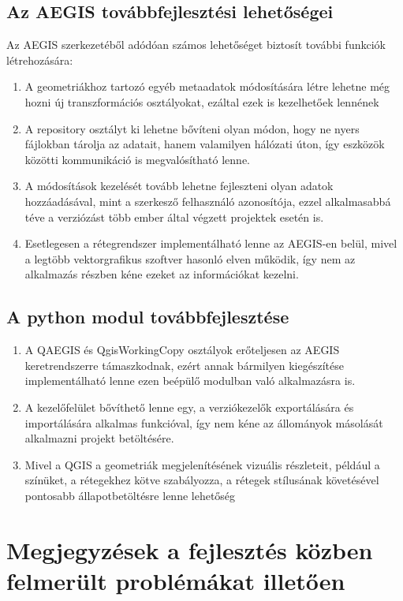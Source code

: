\subsection{Az AEGIS továbbfejlesztési lehetőségei}
Az AEGIS szerkezetéből adódóan számos lehetőséget biztosít további funkciók létrehozására:
\begin{enumerate}
	\item A geometriákhoz tartozó egyéb metaadatok módosítására létre lehetne még hozni új transzformációs osztályokat, ezáltal ezek is kezelhetőek lennének
	\item A repository osztályt ki lehetne bővíteni olyan módon, hogy ne nyers fájlokban tárolja az adatait, hanem valamilyen hálózati úton, így eszközök közötti kommunikáció is megvalósítható lenne.
	\item A módosítások kezelését tovább lehetne fejleszteni olyan adatok hozzáadásával, mint a szerkesző felhasználó azonosítója, ezzel alkalmasabbá téve a verziózást több ember által végzett projektek esetén is.
	\item Esetlegesen a rétegrendszer implementálható lenne az AEGIS-en belül, mivel a legtöbb vektorgrafikus szoftver hasonló elven működik, így nem az alkalmazás részben kéne ezeket az információkat kezelni.
\end{enumerate}
\subsection{A python modul továbbfejlesztése}
\begin{enumerate}
	\item A QAEGIS és QgisWorkingCopy osztályok erőteljesen az AEGIS keretrendszerre támaszkodnak, ezért annak bármilyen kiegészítése implementálható lenne ezen beépülő modulban való alkalmazásra is.
	\item A kezelőfelület bővíthető lenne egy, a verziókezelők exportálására és importálására alkalmas funkcióval, így nem kéne az állományok másolását alkalmazni projekt betöltésére.
	\item Mivel a QGIS a geometriák megjelenítésének vizuális részleteit, például a színüket, a rétegekhez kötve szabályozza, a rétegek stílusának követésével pontosabb állapotbetöltésre lenne lehetőség
\end{enumerate}

\section{Megjegyzések a fejlesztés közben felmerült problémákat illetően}
